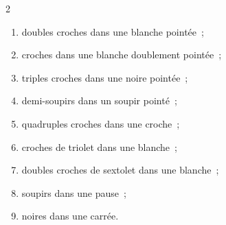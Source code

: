 
\begin{multicols}{2}
\raggedright
\begin{enumerate}[label=\alph*)]
  \item doubles croches dans une blanche pointée~;
  \item croches dans une blanche doublement pointée~;
  \item triples croches dans une noire pointée~;
  \item demi-soupirs dans un soupir pointé~;
  \item quadruples croches dans une croche~;
  \item croches de triolet dans une blanche~;
  \item doubles croches de sextolet dans une blanche~;
  \item soupirs dans une pause~;
  \item noires dans une carrée.
\end{enumerate}
\end{multicols}
